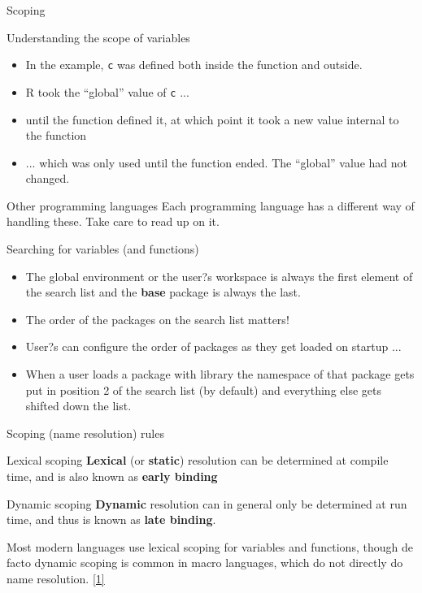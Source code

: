 \documentclass[xcolor=table,compress]{beamer}
\begin{document}
\begin{frame}{Scoping}
\begin{block}{Understanding the scope of variables}
\begin{itemize}[<+->]
\item In the example, \texttt{c} was defined both inside the function and outside. 
\item R took the ``global'' value of \texttt{c} ...
\item until the function defined it, at which point it took a new value internal to the function
\item ... which was only used until the function ended. The ``global'' value had not changed.
\end{itemize}
\end{block}
\pause
\begin{block}{Other programming languages}
Each programming language has a different way of handling these. Take care to read up on it.
\end{block}
\end{frame}




\begin{frame}{Searching for variables (and functions)}
\begin{itemize}
\item The global environment or the user?s workspace is always the first element of the search list and the \textbf{base} package is always the last.
\item The order of the packages on the search list matters!
\item User?s can configure the order of packages as they get loaded on startup ...
\item When a user loads a package with library the namespace of that package gets put in position 2 of the search list (by default) and everything else gets shifted down the list.
\end{itemize}
\end{frame}

\begin{frame}{Scoping (name resolution) rules}
\begin{block}{Lexical scoping}
\textbf{Lexical} (or \textbf{static}) resolution can be determined at compile time, and is also known as \textbf{early binding}
\end{block}
\begin{block}{Dynamic scoping}
\textbf{Dynamic} resolution can in general only be determined at run time, and thus is known as \textbf{late binding}. 
\end{block}
Most modern languages use lexical scoping for variables and functions, though de facto dynamic scoping is common in macro languages, which do not directly do name resolution. \href{http://en.wikipedia.org/wiki/Scope_(computer_science)}{[1]}
\end{frame}
\end{document}
